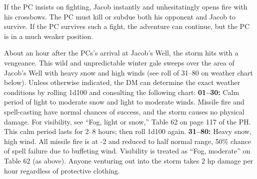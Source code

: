 \documentclass[a5paper,11pt,twoside]{book}
\begin{document}
If the PC insists on fighting, Jacob instantly and unhesitatingly opens fire with his crossbows.
The PC must kill or subdue both his opponent and Jacob to survive.
If the PC survives such a fight, the adventure can continue, but the PC is in a much weaker position.

About an hour after the PCs’s arrival at Jacob’s Well, the storm hits with a vengeance.
This wild and unpredictable winter gale sweeps over the area of Jacob’s Well with heavy snow and high winds (see roll of 31--80 on weather chart below).
Unless otherwise indicated, the DM can determine the exact weather conditions by rolling 1d100 and consulting the following chart:
\vspace{2cm}
\hline
\textbf{\large01--30:} \quad Calm period of light to moderate snow and light to moderate winds.
Missile fire and spell-casting have normal chances of success, and the storm causes no physical damage.
For visibility, see “Fog, light or snow,” Table 62 on page 117 of the PH.
This calm period lasts for 2--8 hours; then roll 1d100 again.
\vspace{0.5em}
\hline
\textbf{\large31--80:} \quad Heavy snow, high wind.
All missile fire is at -2 and reduced to half normal range, 50\% chance of spell failure due to buffeting wind.
Visibility is treated as “Fog, moderate” on Table 62 (as above).
Anyone venturing out into the storm takes 2 hp damage per hour regardless of protective clothing.
\end{document}
